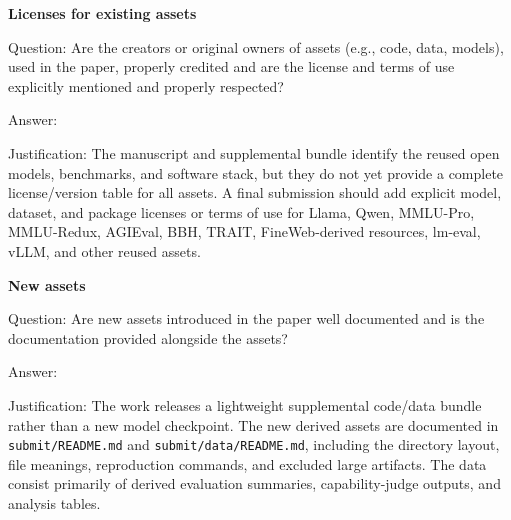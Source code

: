 \item {\bf Licenses for existing assets}
    \item[] Question: Are the creators or original owners of assets (e.g., code, data, models), used in the paper, properly credited and are the license and terms of use explicitly mentioned and properly respected?
    \item[] Answer: \answerNo{}
    \item[] Justification: The manuscript and supplemental bundle identify the reused open models, benchmarks, and software stack, but they do not yet provide a complete license/version table for all assets. A final submission should add explicit model, dataset, and package licenses or terms of use for Llama, Qwen, MMLU-Pro, MMLU-Redux, AGIEval, BBH, TRAIT, FineWeb-derived resources, lm-eval, vLLM, and other reused assets.

\item {\bf New assets}
    \item[] Question: Are new assets introduced in the paper well documented and is the documentation provided alongside the assets?
    \item[] Answer: \answerYes{}
    \item[] Justification: The work releases a lightweight supplemental code/data bundle rather than a new model checkpoint. The new derived assets are documented in \texttt{submit/README.md} and \texttt{submit/data/README.md}, including the directory layout, file meanings, reproduction commands, and excluded large artifacts. The data consist primarily of derived evaluation summaries, capability-judge outputs, and analysis tables.
